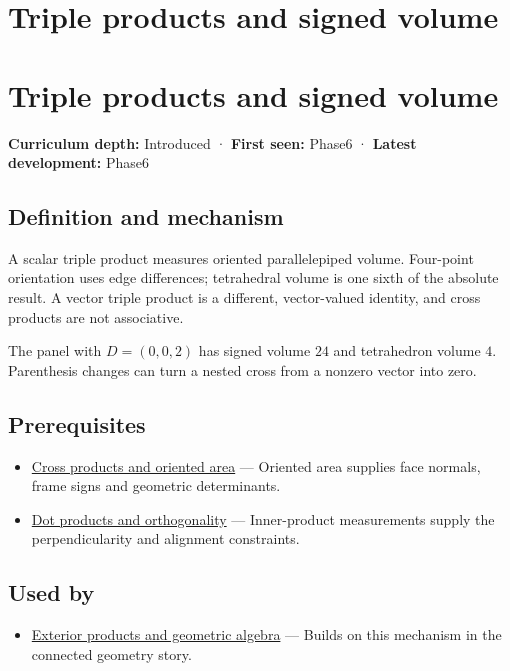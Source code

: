 \hypertarget{appendix-5caa058bd9c7}{}
\section*{Triple products and signed volume}
\section{Triple products and signed volume}\label{triple-products-and-signed-volume}

\textbf{Curriculum depth:} Introduced · \textbf{First seen:} Phase6 · \textbf{Latest development:} Phase6

\subsection{Definition and mechanism}\label{definition-and-mechanism}

A scalar triple product measures oriented parallelepiped volume. Four-point orientation uses edge differences; tetrahedral volume is one sixth of the absolute result. A vector triple product is a different, vector-valued identity, and cross products are not associative.

The panel with \(D=(0,0,2)\) has signed volume \(24\) and tetrahedron volume \(4\). Parenthesis changes can turn a nested cross from a nonzero vector into zero.

\subsection{Prerequisites}\label{prerequisites}

\begin{itemize}
\tightlist
\item
  \hyperref[appendix-2391db8052b1]{Cross products and oriented area} --- Oriented area supplies face normals, frame signs and geometric determinants.
\item
  \hyperref[appendix-8bc4e8fc547c]{Dot products and orthogonality} --- Inner-product measurements supply the perpendicularity and alignment constraints.
\end{itemize}

\subsection{Used by}\label{used-by}

\begin{itemize}
\tightlist
\item
  \hyperref[appendix-e1960925d1b8]{Exterior products and geometric algebra} --- Builds on this mechanism in the connected geometry story.
\end{itemize}

